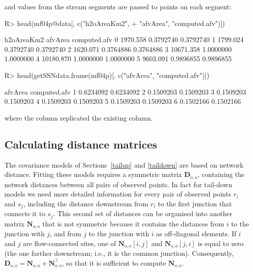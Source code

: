 \documentclass[nojss]{jss}
\renewenvironment{Schunk}{\vspace{\topsep}}{\vspace{\topsep}}
\begin{document}
and values from the stream segments are passed to points on each
segment:
\begin{Schunk}
\begin{Sinput}
R> head(mf04p@data[, c("h2oAreaKm2",
+     "afvArea", "computed.afv")])
\end{Sinput}
\begin{Soutput}
  h2oAreaKm2   afvArea computed.afv
0   1970.558 0.3792740    0.3792740
1   1799.024 0.3792740    0.3792740
2   1620.071 0.3764886    0.3764886
3  10671.358 1.0000000    1.0000000
4  10180.870 1.0000000    1.0000000
5   9603.091 0.9896855    0.9896855
\end{Soutput}
\begin{Sinput}
R> head(getSSNdata.frame(mf04p)[, c("afvArea", "computed.afv")])
\end{Sinput}
\begin{Soutput}
    afvArea computed.afv
1 0.6234092    0.6234092
2 0.1509203    0.1509203
3 0.1509203    0.1509203
4 0.1509203    0.1509203
5 0.1509203    0.1509203
6 0.1502166    0.1502166
\end{Soutput}
\end{Schunk}
where the  column replicated the existing
 column.


\subsection{Calculating distance matrices}\label{CalcDist}

The covariance models of Sections~\ref{tailup} and \ref{taildown} are
based on network distance.  Fitting these models requires a symmetric
matrix $\mathbf{D}_{o,o}$, containing the network distances between
all pairs of observed points.  In fact for tail-down models we need
more detailed information for every pair of observed points $r_i$ and
$s_j$, including the distance downstream from $r_i$ to the first
junction that connects it to $s_j$. This second set of distances can
be organised into another matrix $\mathbf{N}_{o,o}$ that is not
symmetric because it contains the distances from $i$ to the junction
with $j$, and from $j$ to the junction with $i$ as off-diagonal
elements. If $i$ and $j$ are flow-connected sites, one of
$\mathbf{N}_{o,o}[i, j]$ and $\mathbf{N}_{o,o}[j, i]$ is equal to zero
(the one farther downstream; i.e., it is the common
junction). Consequently, $\mathbf{D}_{o,o} = \mathbf{N}_{o,o} +
\mathbf{N}_{o,o}^\top$, so that it is sufficient to compute
$\mathbf{N}_{o,o}$.
\end{document}
